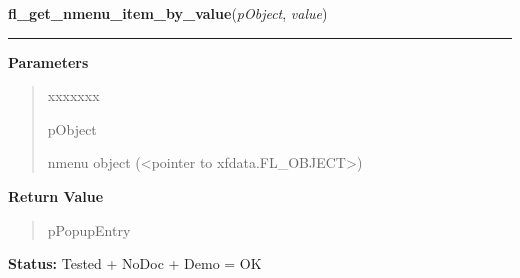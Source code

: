 \hspace{.8\funcindent}\begin{boxedminipage}{\funcwidth}

    \raggedright \textbf{fl\_get\_nmenu\_item\_by\_value}(\textit{pObject}, \textit{value})

    \vspace{-1.5ex}

    \rule{\textwidth}{0.5\fboxrule}
\setlength{\parskip}{2ex}
\setlength{\parskip}{1ex}
      \textbf{Parameters}
      \vspace{-1ex}

      \begin{quote}
        \begin{Ventry}{xxxxxxx}

          \item[pObject]

          nmenu object ({\textless}pointer to 
          xfdata.FL\_OBJECT{\textgreater})

        \end{Ventry}

      \end{quote}

      \textbf{Return Value}
    \vspace{-1ex}

      \begin{quote}
      pPopupEntry

      \end{quote}

\textbf{Status:} Tested + NoDoc + Demo = OK



    \end{boxedminipage}

    \label{xformslib:library:fl_get_nmenu_item_by_label}

    \vspace{0.5ex}

